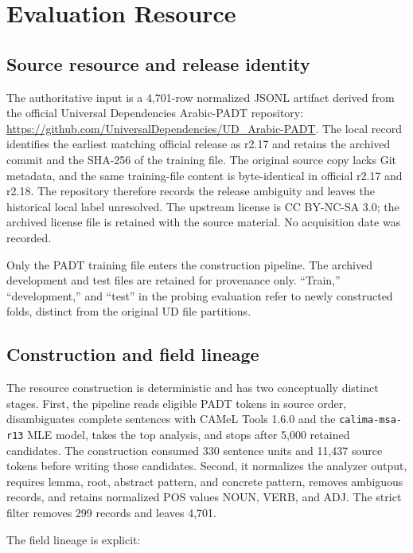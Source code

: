 \documentclass[pdflatex,sn-basic]{sn-jnl}
\begin{document}
\section{Evaluation Resource}

\subsection{Source resource and release identity}

The authoritative input is a 4,701-row normalized JSONL artifact derived from
the official Universal Dependencies Arabic-PADT repository:
\url{https://github.com/UniversalDependencies/UD_Arabic-PADT}. The local
record identifies the earliest matching official release as r2.17 and retains
the archived commit and the SHA-256 of the training file. The original source
copy lacks Git metadata, and the same training-file content is byte-identical
in official r2.17 and r2.18. The repository therefore records the release
ambiguity and leaves the historical local label unresolved. The upstream license is CC BY-NC-SA 3.0; the archived license
file is retained with the source material. No acquisition date was recorded.

Only the PADT training file enters the construction pipeline. The archived
development and test files are retained for provenance only. ``Train,''
``development,'' and ``test'' in the probing evaluation refer to newly
constructed folds, distinct from the original UD file partitions.

\subsection{Construction and field lineage}

The resource construction is deterministic and has two conceptually distinct
stages. First, the pipeline reads eligible PADT tokens in source order,
disambiguates complete sentences with CAMeL Tools 1.6.0 and the
\texttt{calima-msa-r13} MLE model, takes the top analysis, and stops after
5,000 retained candidates. The construction consumed 330 sentence units and
11,437 source tokens before writing those candidates. Second, it normalizes
the analyzer output, requires lemma, root, abstract pattern, and concrete
pattern, removes ambiguous records, and retains normalized POS values NOUN,
VERB, and ADJ. The strict filter removes 299 records and leaves 4,701.

The field lineage is explicit:
\end{document}
